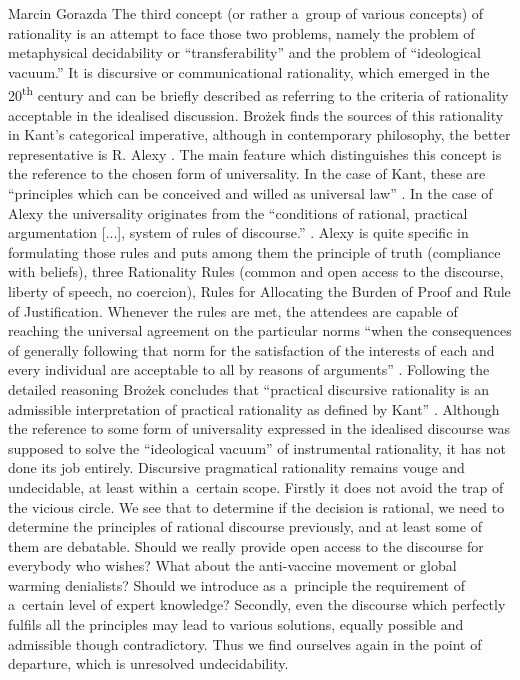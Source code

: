 \begin{artengenv}{Marcin Gorazda}
The third concept (or rather a~group of various concepts) of rationality is an attempt to face those two problems, namely the problem of metaphysical decidability or ``transferability'' and the problem of ``ideological vacuum.'' It is discursive or communicational rationality, which emerged in the 20\textsuperscript{th} century and can be briefly described as referring to the criteria of rationality acceptable in the idealised discussion. Brożek finds the sources of this rationality in Kant's categorical imperative, although in contemporary philosophy, the better representative is R. Alexy
\parencite*[][]{alexy_discourse-theoretical_1992}. %
 The main feature which distinguishes this concept is the reference to the chosen form of universality. In the case of Kant, these are ``principles which can be conceived and willed as universal law'' 
\parencite[][p.170]{brozek_rationality_2007}. %
 In the case of Alexy the universality originates from the ``conditions of rational, practical argumentation [...], system of rules of discourse.'' 
\parencite[][p.235]{alexy_discourse-theoretical_1992}. %
 Alexy is quite specific in formulating those rules and puts among them the principle of truth (compliance with beliefs), three Rationality Rules (common and open access to the discourse, liberty of speech, no coercion), Rules for Allocating the Burden of Proof and Rule of Justification. Whenever the rules are met, the attendees are capable of reaching the universal agreement on the particular norms ``when the consequences of generally following that norm for the satisfaction of the interests of each and every individual are acceptable to all by reasons of arguments'' 
\parencite[][p.172]{brozek_rationality_2007}. %
 Following the detailed reasoning Brożek concludes that ``practical discursive rationality is an admissible interpretation of practical rationality as defined by Kant'' 
\parencite[][p.173]{brozek_rationality_2007}. %
 Although the reference to some form of universality expressed in the idealised discourse was supposed to solve the ``ideological vacuum'' of instrumental rationality, it has not done its job entirely. Discursive pragmatical rationality remains vouge and undecidable, at least within a~certain scope. Firstly it does not avoid the trap of the vicious circle. We see that to determine if the decision is rational, we need to determine the principles of rational discourse previously, and at least some of them are debatable. Should we really provide open access to the discourse for everybody who wishes? What about the anti-vaccine movement or global warming denialists? Should we introduce as a~principle the requirement of a~certain level of expert knowledge? Secondly, even the discourse which perfectly fulfils all the principles may lead to various solutions, equally possible and admissible though contradictory. Thus we find ourselves again in the point of departure, which is unresolved undecidability.


\end{artengenv}

